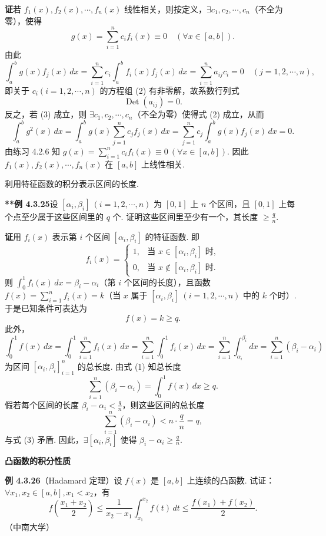 \documentclass[UTF8,12pt,a4paper,fontset=fandol]{ctexart}
\begin{document}
\noindent\textbf{证}\quad 若 $f_1(x),f_2(x),\cdots,f_n(x)$ 线性相关，则按定义，$\exists c_1,c_2,\cdots,c_n$（不全为零），使得
\[
g(x)=\sum_{i=1}^n c_i f_i(x)\equiv0\quad(\forall x\in[a,b]).
\tag{1}
\]
由此
\[
\int_a^b g(x)f_j(x)\,dx
=\sum_{i=1}^n c_i\int_a^b f_i(x)f_j(x)\,dx
=\sum_{i=1}^n a_{ij}c_i=0\quad(j=1,2,\cdots,n),
\tag{2}
\]
即关于 $c_i(i=1,2,\cdots,n)$ 的方程组 (2) 有非零解，故系数行列式
\[
\operatorname{Det}(a_{ij})=0.
\tag{3}
\]
反之，若 (3) 成立，则 $\exists c_1,c_2,\cdots,c_n$（不全为零）使得式 (2) 成立，从而
\[
\int_a^b g^2(x)\,dx
=\int_a^b g(x)\sum_{j=1}^n c_j f_j(x)\,dx
=\sum_{j=1}^n c_j\int_a^b g(x)f_j(x)\,dx=0.
\]
由练习 4.2.6 知 $g(x)=\sum_{i=1}^n c_i f_i(x)\equiv0\ (\forall x\in[a,b])$. 因此 $f_1(x),f_2(x),\cdots,f_n(x)$ 在 $[a,b]$ 上线性相关.

\noindent 利用特征函数的积分表示区间的长度.

\noindent\textbf{**例 4.3.25}\quad 设 $[\alpha_i,\beta_i]\ (i=1,2,\cdots,n)$ 为 $[0,1]$ 上 $n$ 个区间，且 $[0,1]$ 上每个点至少属于这些区间里的 $q$ 个. 证明这些区间里至少有一个，其长度 $\ge\frac{q}{n}$.

\noindent\textbf{证}\quad 用 $f_i(x)$ 表示第 $i$ 个区间 $[\alpha_i,\beta_i]$ 的特征函数. 即
\[
f_i(x)=
\begin{cases}
1, & \text{当 }x\in[\alpha_i,\beta_i]\text{ 时},\\
0, & \text{当 }x\notin[\alpha_i,\beta_i]\text{ 时}.
\end{cases}
\]
则 $\int_0^1 f_i(x)\,dx=\beta_i-\alpha_i$（第 $i$ 个区间的长度），且函数 $f(x)=\sum_{i=1}^n f_i(x)=k$（当 $x$ 属于 $[\alpha_i,\beta_i]\ (i=1,2,\cdots,n)$ 中的 $k$ 个时）. 于是已知条件可表达为
\[
f(x)=k\ge q.
\tag{1}
\]
此外，
\[
\int_0^1 f(x)\,dx
=\int_0^1\sum_{i=1}^n f_i(x)\,dx
=\sum_{i=1}^n\int_0^1 f_i(x)\,dx
=\sum_{i=1}^n\int_{\alpha_i}^{\beta_i}dx
=\sum_{i=1}^n(\beta_i-\alpha_i)
\tag{2}
\]
为区间 $[\alpha_i,\beta_i]_{i=1}^n$ 的总长度. 由式 (1) 知总长度
\[
\sum_{i=1}^n(\beta_i-\alpha_i)=\int_0^1 f(x)\,dx\ge q.
\tag{3}
\]
假若每个区间的长度 $\beta_i-\alpha_i<\frac{q}{n}$，则这些区间的总长度
\[
\sum_{i=1}^n(\beta_i-\alpha_i)<n\cdot\frac{q}{n}=q,
\]
与式 (3) 矛盾. 因此，$\exists[\alpha_i,\beta_i]$ 使得 $\beta_i-\alpha_i\ge\frac{q}{n}$.

\noindent\textbf{凸函数的积分性质}

\noindent\textbf{例 4.3.26}\quad （Hadamard 定理）设 $f(x)$ 是 $[a,b]$ 上连续的凸函数. 试证：$\forall x_1,x_2\in[a,b],x_1<x_2$，有
\[
f\left(\frac{x_1+x_2}{2}\right)
\le\frac1{x_2-x_1}\int_{x_1}^{x_2}f(t)\,dt
\le\frac{f(x_1)+f(x_2)}2.
\]
（中南大学）
\end{document}
